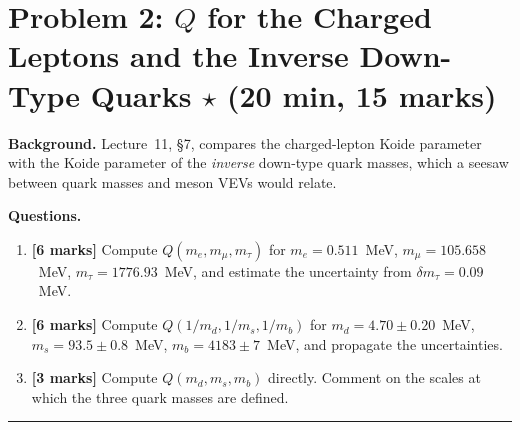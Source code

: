 \documentclass[11pt,a4paper]{article}
\begin{document}
\bigskip

\section*{Problem 2: $Q$ for the Charged Leptons and the Inverse
  Down-Type Quarks
  \hfill $\star$ \normalsize(20 min, 15 marks)}
\label{prob:Q-values}

\noindent\textbf{Background.}
Lecture~11, \S7, compares the charged-lepton Koide parameter with the
Koide parameter of the \emph{inverse} down-type quark masses, which a
seesaw between quark masses and meson VEVs would relate.

\medskip

\noindent\textbf{Questions.}
\begin{enumerate}[label=(\alph*)]
  \item \textbf{[6 marks]}
    Compute $Q(m_e,m_\mu,m_\tau)$ for $m_e = 0.511$~MeV,
    $m_\mu = 105.658$~MeV, $m_\tau = 1776.93$~MeV, and estimate the
    uncertainty from $\delta m_\tau = 0.09$~MeV.
  \item \textbf{[6 marks]}
    Compute $Q(1/m_d,1/m_s,1/m_b)$ for $m_d = 4.70 \pm 0.20$~MeV,
    $m_s = 93.5 \pm 0.8$~MeV, $m_b = 4183 \pm 7$~MeV, and propagate
    the uncertainties.
  \item \textbf{[3 marks]}
    Compute $Q(m_d,m_s,m_b)$ directly.  Comment on the scales at which
    the three quark masses are defined.
\end{enumerate}


\bigskip
\hrule
\bigskip
\end{document}
